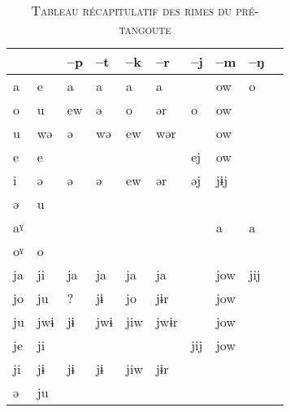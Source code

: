 \documentclass[oldfontcommands,twoside,a4paper,11pt,draft]{memoir}
\newcommand{\ipapl}[1]{{\phondroit #1}}
\newcommand{\captionb}[1]{\caption{\textsc{#1}}}
\begin{document}
\begin{table}
\captionb{Tableau récapitulatif des rimes du pré-tangoute}\label{tab:rimes}
\begin{tabular}{l|lllllllll} \toprule
\ipapl{}	&	\ipapl{0}	&	\ipapl{*--p}	&	\ipapl{*--t}	&	\ipapl{*--k}	&	\ipapl{*--r}		&	\ipapl{*--j}	&	\ipapl{*--m}	&	\ipapl{*--ŋ}	\\
\midrule
\ipapl{*a}	&	\ipapl{e}	&	\ipapl{a}	&	\ipapl{a}	&	\ipapl{a}	&	\ipapl{a}	&	\ipapl{}	&	\ipapl{ow}	&	\ipapl{o}	\\
\ipapl{*o}	&	\ipapl{u}	&	\ipapl{ew}	&	\ipapl{ə}	&	\ipapl{o}	&	\ipapl{ər}	&	\ipapl{o}	&	\ipapl{ow}	&	\ipapl{}	\\
\ipapl{*u}	&	\ipapl{wə}	&	\ipapl{ə}	&	\ipapl{wə}	&	\ipapl{ew}	&	\ipapl{wər}		&	\ipapl{}	&	\ipapl{ow}	&	\ipapl{}	\\
\ipapl{*e}	&	\ipapl{e}	&	\ipapl{}	&	\ipapl{}	&	\ipapl{}	&	\ipapl{}	&		\ipapl{ej}	&	\ipapl{ow}	&	\ipapl{}	\\
\ipapl{*i}	&	\ipapl{ə}	&	\ipapl{ə}	&	\ipapl{ə}	&	\ipapl{ew}	&	\ipapl{ər}		&	\ipapl{əj}	&	\ipapl{jɨj}	&	\ipapl{}	\\
\ipapl{*ə}	 &\ipapl{u} \\
\midrule
\ipapl{*aˠ}	&	\ipapl{}	&	\ipapl{}	&	\ipapl{}	&	\ipapl{}	&	\ipapl{}	&	\ipapl{}	&	\ipapl{a}	&	\ipapl{a}	\\
\ipapl{*oˠ}	&	\ipapl{o}	&	\ipapl{}	&	\ipapl{}	&	\ipapl{}	&	\ipapl{}	&		\ipapl{}	&	\ipapl{}	&	\ipapl{}	\\
\midrule
\ipapl{*ja}	&	\ipapl{ji}	&	\ipapl{ja}	&	\ipapl{ja}	&	\ipapl{ja}	&	\ipapl{ja}		&	\ipapl{}	&	\ipapl{jow}	&	\ipapl{jij}	\\
\ipapl{*jo}	&	\ipapl{ju}	&	\ipapl{?}	&	\ipapl{jɨ}	&	\ipapl{jo}	&	\ipapl{jɨr}		&	\ipapl{}	&	\ipapl{jow}	&	\ipapl{}	\\
\ipapl{*ju}	&	\ipapl{jwɨ}	&	\ipapl{jɨ}	&	\ipapl{jwɨ}	&	\ipapl{jiw}	&	\ipapl{jwɨr}		&	\ipapl{}	&	\ipapl{jow}	&	\ipapl{}	\\
\ipapl{*je}	&	\ipapl{ji}	&	\ipapl{}	&	\ipapl{}	&	\ipapl{}	&	\ipapl{}	&	\ipapl{jij}	&	\ipapl{jow}	&	\ipapl{}	\\
\ipapl{*ji}	&	\ipapl{jɨ}	&	\ipapl{jɨ}	&	\ipapl{jɨ}	&	\ipapl{jiw}	&	\ipapl{jɨr}		&		&	\ipapl{}	&	\ipapl{}	\\
\ipapl{*ə}	 &\ipapl{ju} \\

\bottomrule
\end{tabular}
\end{table}
\end{document}
